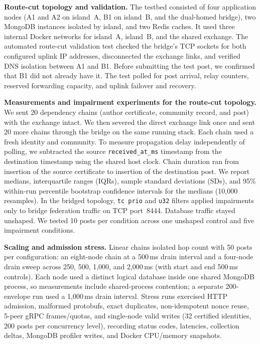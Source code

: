\documentclass[conference,a4paper,10pt]{IEEEtran}
\begin{document}
\textbf{Route-cut topology and validation.} The testbed consisted of four application nodes (A1 and A2 on island~A, B1 on island~B, and the dual-homed bridge), two MongoDB instances isolated by island, and two Redis caches. It used three internal Docker networks for island~A, island~B, and the shared exchange. The automated route-cut validation test checked the bridge's TCP sockets for both configured uplink IP addresses, disconnected the exchange links, and verified DNS isolation between A1 and B1. Before submitting the test post, we confirmed that B1 did not already have it. The test polled for post arrival, relay counters, reserved forwarding capacity, and uplink failover and recovery.

\textbf{Measurements and impairment experiments for the route-cut topology.} We sent 20 dependency chains (author certificate, community record, and post) with the exchange intact. We then severed the direct exchange link once and sent 20 more chains through the bridge on the same running stack. Each chain used a fresh identity and community. To measure propagation delay independently of polling, we subtracted the source \texttt{received\_at\_ms} timestamp from the destination timestamp using the shared host clock. Chain duration ran from insertion of the source certificate to insertion of the destination post. We report medians, interquartile ranges (IQRs), sample standard deviations (SDs), and 95\% within-run percentile bootstrap confidence intervals for the medians (10,000 resamples). In the bridged topology, \texttt{tc prio} and \texttt{u32} filters applied impairments only to bridge federation traffic on TCP port~8444. Database traffic stayed unshaped. We tested 10 posts per condition across one unshaped control and five impairment conditions.

\textbf{Scaling and admission stress.} Linear chains isolated hop count with 50 posts per configuration: an eight-node chain at a 500\,ms drain interval and a four-node drain sweep across 250, 500, 1,000, and 2,000\,ms (with start and end 500\,ms controls). Each node used a distinct logical database inside one shared MongoDB process, so measurements include shared-process contention; a separate 200-envelope run used a 1,000\,ms drain interval. Stress runs exercised HTTP admission, malformed protobufs, exact duplicates, non-idempotent nonce reuse, 5-peer gRPC frames/quotas, and single-node valid writes (32 certified identities, 200 posts per concurrency level), recording status codes, latencies, collection deltas, MongoDB profiler writes, and Docker CPU/memory snapshots.
\end{document}
